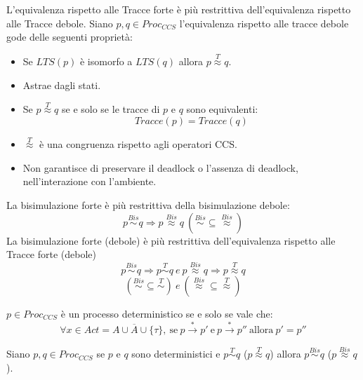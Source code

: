 L'equivalenza rispetto alle Tracce forte è più restrittiva dell'equivalenza
rispetto alle Tracce debole. Siano $p, q \in Proc_{CCS}$ l'equivalenza rispetto
alle tracce debole gode delle seguenti proprietà:
\begin{itemize}
    \item Se $LTS(p)$ è isomorfo a $LTS(q)$ allora $p \stackrel{T}{\approx} q$.
    \item Astrae dagli stati.
    \item Se $p \stackrel{T}{\approx} q$ se e solo se le tracce di $p$ e $q$ sono
          equivalenti: $$Tracce(p) = Tracce(q)$$
    \item $\stackrel{T}{\approx}$ è una congruenza rispetto agli operatori CCS.
    \item Non garantisce di preservare il deadlock o l'assenza di deadlock,
          nell'interazione con l'ambiente.
\end{itemize}
La bisimulazione forte è più restrittiva della bisimulazione debole:
$$p \stackrel{Bis}{\sim} q \Rightarrow p \stackrel{Bis}{\approx} q \ ( \stackrel{Bis}{\sim} \subseteq \stackrel{Bis}{\approx})$$
La bisimulazione forte (debole) è più restrittiva dell'equivalenza rispetto alle
Tracce forte (debole)
$$p \stackrel{Bis}{\sim} q \Rightarrow p \stackrel{T}{\sim} q \ e \ p \stackrel{Bis}{\approx} q \Rightarrow p \stackrel{T}{\approx} q$$
$$(\stackrel{Bis}{\sim} \subseteq \stackrel{T}{\sim}) \ e \ (\stackrel{Bis}{\approx} \subseteq \stackrel{T}{\approx})$$
\begin{definizione}
    $p \in Proc_{CCS}$ è un processo deterministico se e solo se vale che:
    $$\forall x \in Act = A \cup \overline{A} \cup \{\tau\}, \ \text{se} \ p \xrightarrow{\ast} p' \ \text{e} \ p \xrightarrow{\ast} p'' \ \text{allora} \ p' = p''$$
\end{definizione}
Siano $p, q \in Proc_{CCS}$ se $p$ e $q$ sono deterministici e
$p \stackrel{T}{\sim} q$ ($p \stackrel{T}{\approx} q$) allora
$p \stackrel{Bis}{\sim} q$ ($p \stackrel{Bis}{\approx} q$).

